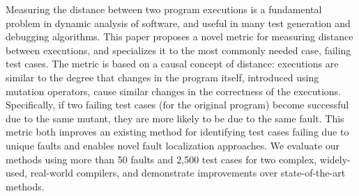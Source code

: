 Measuring the distance between two program executions is a fundamental problem in dynamic analysis of software, and useful in many test generation and debugging algorithms.  This paper proposes a novel metric for measuring distance between executions, and specializes it to the most commonly needed case, failing test cases.  The metric is based on a causal concept of distance: executions are similar to the degree that changes in the program itself, introduced using mutation operators, cause similar changes in the correctness of the executions.  Specifically, if two failing test cases (for the original program) become successful due to the same mutant, they are more likely to be due to the same fault.  This metric both improves an existing method for identifying test cases failing due to unique faults and enables novel fault localization approaches.  We evaluate our methods using more than 50 faults and 2,500 test cases for two complex, widely-used, real-world compilers, and demonstrate improvements over state-of-the-art methods.  